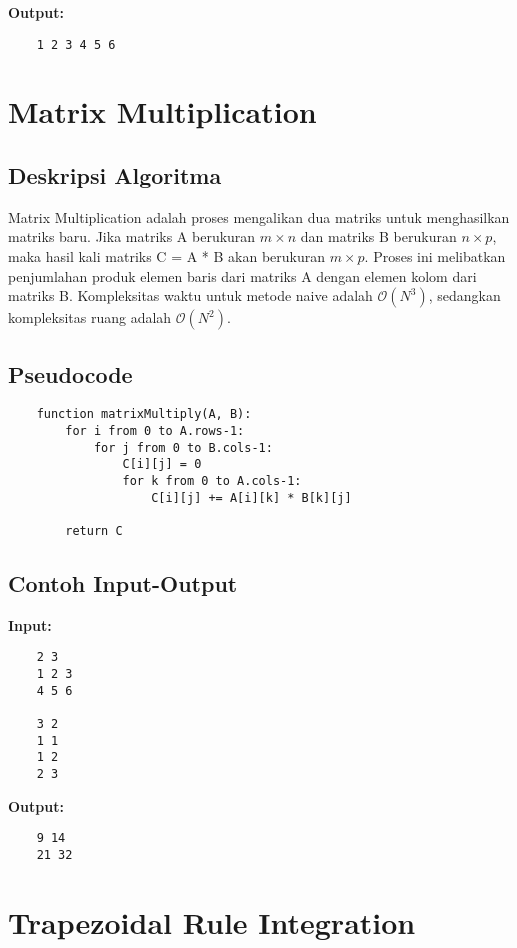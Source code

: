 \textbf{Output:}
\begin{verbatim}
    1 2 3 4 5 6
\end{verbatim}

\section{Matrix Multiplication}
\label{sec:matrix-multiplication-implementation}

\subsection{Deskripsi Algoritma}
Matrix Multiplication adalah proses mengalikan dua matriks untuk menghasilkan matriks baru. Jika matriks A berukuran $m \times n$ dan matriks B berukuran $n \times p$, maka hasil kali matriks C = A * B akan berukuran $m \times p$. Proses ini melibatkan penjumlahan produk elemen baris dari matriks A dengan elemen kolom dari matriks B. Kompleksitas waktu untuk metode naive adalah $\mathcal{O}\left(N^3\right)$, sedangkan kompleksitas ruang adalah $\mathcal{O}\left(N^2\right)$.

\subsection{Pseudocode}
\begin{verbatim}
    function matrixMultiply(A, B):
        for i from 0 to A.rows-1:
            for j from 0 to B.cols-1:
                C[i][j] = 0
                for k from 0 to A.cols-1:
                    C[i][j] += A[i][k] * B[k][j]

        return C
\end{verbatim}

\subsection{Contoh Input-Output}
\textbf{Input:}
\begin{verbatim}
    2 3
    1 2 3
    4 5 6

    3 2
    1 1
    1 2
    2 3
\end{verbatim}

\textbf{Output:}
\begin{verbatim}
    9 14
    21 32
\end{verbatim}

\section{Trapezoidal Rule Integration}
\label{sec:trapezoidal-rule-integration-implementation}

